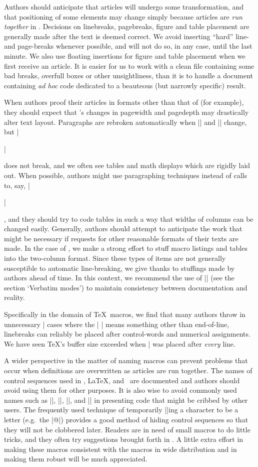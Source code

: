 Authors should anticipate that articles will undergo some
transformation, and that positioning of some elements may change
simply because articles are {\it run together\/} in \TUB.  Decisions
on linebreaks, pagebreaks, figure and table placement are generally
made after the text is deemed correct. We avoid inserting ``hard''
line- and page-breaks whenever possible, and will not do so, in any
case, until the last minute.  We also use floating insertions for
figure and table placement when we first receive an article.  It is
easier for us to work with a clean file containing some bad breaks,
overfull boxes or other unsightliness, than it is to handle a document
containing {\it ad hoc\/} code dedicated to a beauteous (but
narrowly specific) result.


When authors proof their articles in formats other than that of \TUB\/
(for example), they should expect that \TUB's changes in pagewidth and
pagedepth may drastically alter text layout.  Paragraphs are rebroken
automatically when |\hsize| and |\vsize| change, but |\centerline| does
not break, and we often see tables and math displays which are rigidly
laid out.  When possible, authors might use paragraphing techniques
instead of calls to, say, |\centerline|, and they should try to code
tables in such a way that widths of columns can be changed easily.
Generally, authors should attempt to anticipate the work that might be
necessary if requests for other reasonable formats of their texts are
made.  In the case of \TUB, we make a strong effort to stuff macro
listings and tables into the two-column format.  Since these types of
items are not generally susceptible to automatic line-breaking, we give
thanks to stuffings made by authors ahead of time.  In this context, we
recommend the use of || (see the section `{Verbatim
modes}') to maintain consistency between documentation and reality.

Specifically in the domain of \TeX\ macros, we find that many authors
throw in unnecessary |%
cases where the |^^M| means something other than end-of-line,
linebreaks can reliably be placed after control-words and numerical
assignments.  We have seen \TeX's buffer size exceeded when |%
was placed after {\it every\/} line.

A wider perspective in the matter of naming macros can prevent
problems that occur when definitions are overwritten as articles are
run together.  The names of control sequences used in \plain, \LaTeX,
and \AmSTeX\ are documented and authors should avoid using them for
other purposes.  It is also wise to avoid commonly used names such as
|\temp|, |\result|, |\1|, and |\mac| in presenting code that might be
cribbed by other users.  The frequently used technique of temporarily
|\catcode|ing a character to be a letter (e.g.\ the |@|) provides a
good method of hiding control sequences so that they will not be
clobbered later.  Readers are in need of small macros to do little
tricks, and they often try suggestions brought forth in \TUB.  A
little extra effort in making these macros consistent with the macros
in wide distribution and in making them robust will be much
appreciated.


